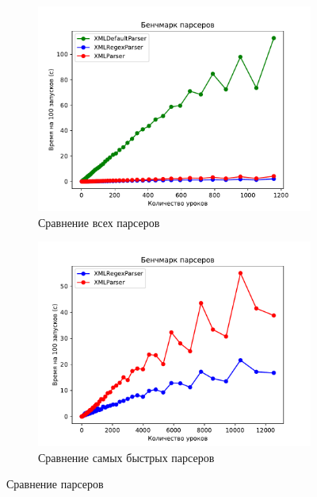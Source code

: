 \begin{figure}[ht]
    \centering
    \begin{subfigure}[b]{0.45\textwidth}
        \centering
        \includegraphics[width=\textwidth]{img/benchmark_all.pdf}
        \caption{Сравнение всех парсеров}
        \label{fig:all}
    \end{subfigure}
    \begin{subfigure}[b]{0.45\textwidth}
        \centering
        \includegraphics[width=\textwidth]{img/benchmark_fastest.pdf}
        \caption{Сравнение самых быстрых парсеров}
        \label{fig:fastest}
    \end{subfigure}
    \caption{Сравнение парсеров}
\end{figure}

